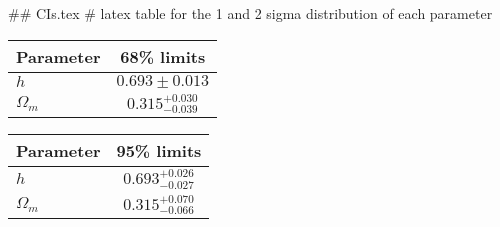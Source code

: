 ## CIs.tex
# latex table for the 1 and 2 sigma distribution of each parameter

\begin{tabular} { l  c}
 Parameter &  68\% limits\\
\hline
{\boldmath$h              $} & $0.693\pm 0.013            $\\
{\boldmath$\Omega_m       $} & $0.315^{+0.030}_{-0.039}   $\\
\hline
\end{tabular}

\begin{tabular} { l  c}
 Parameter &  95\% limits\\
\hline
{\boldmath$h              $} & $0.693^{+0.026}_{-0.027}   $\\
{\boldmath$\Omega_m       $} & $0.315^{+0.070}_{-0.066}   $\\
\hline
\end{tabular}
